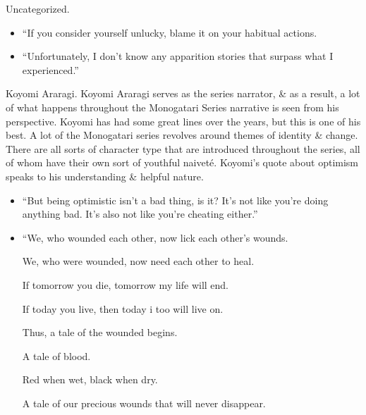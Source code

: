 \documentclass{article}
\begin{document}
\begin{enumerate}
    {\sf Uncategorized.}
    \begin{itemize}
    	\item ``If you consider yourself unlucky, blame it on your habitual actions.\\
    	\item ``Unfortunately, I don't know any apparition stories that surpass what I experienced.''
    \end{itemize}
    
    {\sf Koyomi Araragi.} Koyomi Araragi serves as the series narrator, \& as a result, a lot of what happens throughout the Monogatari Series narrative is seen from his perspective. Koyomi has had some great lines over the years, but this is one of his best. A lot of the Monogatari series revolves around themes of identity \& change. There are all sorts of character type that are introduced throughout the series, all of whom have their own sort of youthful naiveté. Koyomi's quote about optimism speaks to his understanding \& helpful nature.
    \begin{itemize}
    	\item ``But being optimistic isn't a bad thing, is it? It's not like you're doing anything bad. It's also not like you're cheating either.''
    	\item ``We, who wounded each other, now lick each other's wounds.
    	
    	We, who were wounded, now need each other to heal.
    	
    	If tomorrow you die, tomorrow my life will end.
    	
    	If today you live, then today i too will live on.
    	
    	Thus, a tale of the wounded begins.
    	
    	A tale of blood.
    	
    	Red when wet, black when dry.
    	
    	A tale of our precious wounds that will never disappear.
    	

\end{itemize}
\end{enumerate}
\end{document}
